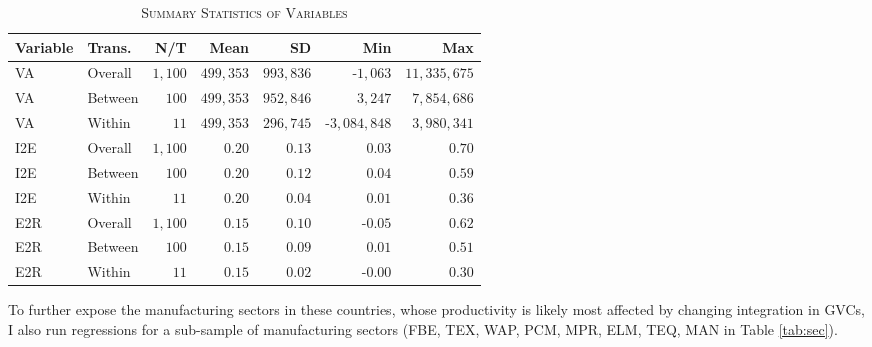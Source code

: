 \documentclass[a4paper]{article}
\begin{document}
\begin{table}[h!] \centering 
  \caption{\label{tab:SUMM_GROWTH}\textsc{Summary Statistics of Variables}}
  \begin{center}
\begin{tabular}{ llrrrrr} \toprule
Variable & Trans. & N/T & Mean & SD & Min & Max \\ \midrule
VA & Overall & $1,100$ & $499,353$ & $993,836$ & -$1,063$ & $11,335,675$ \\ 
VA & Between & $100$ & $499,353$ & $952,846$ & $3,247$ & $7,854,686$ \\ 
VA & Within & $11$ & $499,353$ & $296,745$ & -$3,084,848$ & $3,980,341$ \\ 
I2E & Overall & $1,100$ & $0.20$ & $0.13$ & $0.03$ & $0.70$ \\ 
I2E & Between & $100$ & $0.20$ & $0.12$ & $0.04$ & $0.59$ \\ 
I2E & Within & $11$ & $0.20$ & $0.04$ & $0.01$ & $0.36$ \\ 
E2R & Overall & $1,100$ & $0.15$ & $0.10$ & -$0.05$ & $0.62$ \\ 
E2R & Between & $100$ & $0.15$ & $0.09$ & $0.01$ & $0.51$ \\ 
E2R & Within & $11$ & $0.15$ & $0.02$ & -$0.00$ & $0.30$ \\ \bottomrule
\end{tabular} 
 \end{center}
\end{table} 
\FloatBarrier 

To further expose the manufacturing sectors in these countries, whose productivity is likely most affected by changing integration in GVCs, I also run regressions for a sub-sample of manufacturing sectors (FBE, TEX, WAP, PCM, MPR, ELM, TEQ, MAN in Table \ref{tab:sec}). \newline
\end{document}
